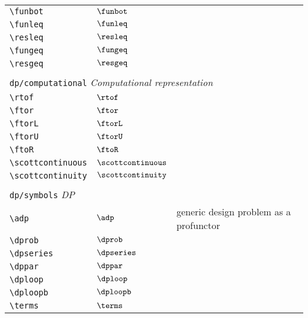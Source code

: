 \begin{longtable}{lll}
 {\color[rgb]{0.5,0.5,0.5}\texttt{\textbackslash funbot}} & $\funbot$ & \\ 
 {\color[rgb]{0.5,0.5,0.5}\texttt{\textbackslash funleq}} & $\funleq$ & \\ 
 {\color[rgb]{0.5,0.5,0.5}\texttt{\textbackslash resleq}} & $\resleq$ & \\ 
 {\color[rgb]{0.5,0.5,0.5}\texttt{\textbackslash fungeq}} & $\fungeq$ & \\ 
 {\color[rgb]{0.5,0.5,0.5}\texttt{\textbackslash resgeq}} & $\resgeq$ & \\ 
  &  & \\ 
 \multicolumn{3}{l}{{\color[rgb]{0.5,0.5,0.5}\texttt{dp/computational}} \emph{Computational representation}}\\ 
 \hline
{\color[rgb]{0.5,0.5,0.5}\texttt{\textbackslash rtof}} & $\rtof$ & \\ 
 {\color[rgb]{0.5,0.5,0.5}\texttt{\textbackslash ftor}} & $\ftor$ & \\ 
 {\color[rgb]{0.5,0.5,0.5}\texttt{\textbackslash ftorL}} & $\ftorL$ & \\ 
 {\color[rgb]{0.5,0.5,0.5}\texttt{\textbackslash ftorU}} & $\ftorU$ & \\ 
 {\color[rgb]{0.5,0.5,0.5}\texttt{\textbackslash ftoR}} & $\ftoR$ & \\ 
 {\color[rgb]{0.5,0.5,0.5}\texttt{\textbackslash scottcontinuous}} & $\scottcontinuous$ & \\ 
 {\color[rgb]{0.5,0.5,0.5}\texttt{\textbackslash scottcontinuity}} & $\scottcontinuity$ & \\ 
  &  & \\ 
 \multicolumn{3}{l}{{\color[rgb]{0.5,0.5,0.5}\texttt{dp/symbols}} \emph{DP}}\\ 
 \hline
{\color[rgb]{0.5,0.5,0.5}\texttt{\textbackslash adp}} & $\adp$ &  generic design problem as a profunctor\\ 
 {\color[rgb]{0.5,0.5,0.5}\texttt{\textbackslash dprob}} & $\dprob$ & \\ 
 {\color[rgb]{0.5,0.5,0.5}\texttt{\textbackslash dpseries}} & $\dpseries$ & \\ 
 {\color[rgb]{0.5,0.5,0.5}\texttt{\textbackslash dppar}} & $\dppar$ & \\ 
 {\color[rgb]{0.5,0.5,0.5}\texttt{\textbackslash dploop}} & $\dploop$ & \\ 
 {\color[rgb]{0.5,0.5,0.5}\texttt{\textbackslash dploopb}} & $\dploopb$ & \\ 
 {\color[rgb]{0.5,0.5,0.5}\texttt{\textbackslash terms}} & $\terms$ & \\ 

\end{longtable}
